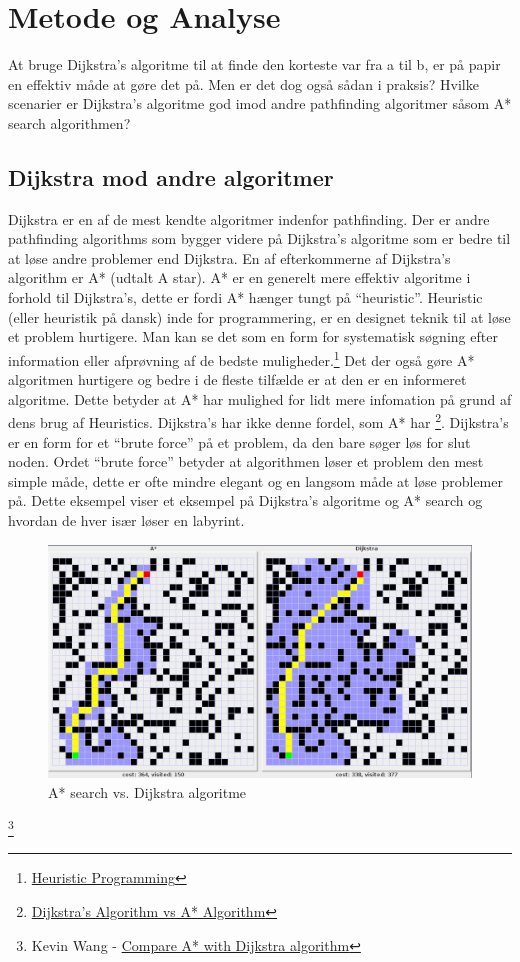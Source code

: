 \documentclass[12pt]{article}
\begin{document}
\section{Metode og Analyse}
At bruge Dijkstra's algoritme til at finde den korteste var fra a til b, er på papir en effektiv måde at gøre det på. Men er det dog også sådan i praksis? Hvilke scenarier er Dijkstra's algoritme god imod andre pathfinding algoritmer såsom A* search algorithmen? 
\subsection{Dijkstra mod andre algoritmer}
Dijkstra er en af de mest kendte algoritmer indenfor pathfinding. 
Der er andre pathfinding algorithms som bygger videre på Dijkstra’s algoritme 
som er bedre til at løse andre problemer end Dijkstra. En af efterkommerne af Dijkstra’s algorithm er A* 
(udtalt A star). A* er en generelt mere effektiv algoritme i forhold til Dijkstra’s, 
dette er fordi A* hænger tungt på “heuristic”. Heuristic (eller heuristik på dansk) inde for programmering, 
er en designet teknik til at løse et problem hurtigere. Man kan se det som en form for systematisk søgning 
efter information eller afprøvning af de bedste muligheder.\footnote{\href{https://softjourn.com/insights/heuristic-programming}{Heuristic Programming}} Det der også gøre A* algoritmen hurtigere 
og bedre i de fleste tilfælde er at den er en informeret algoritme. Dette betyder at A* har mulighed for lidt 
mere infomation på grund af dens brug af Heuristics. Dijkstra’s har ikke denne fordel, som A* har \footnote{\href{https://stackabuse.com/dijkstras-algorithm-vs-a-algorithm/}{Dijkstra's Algorithm vs A* Algorithm}}. Dijkstra’s 
er en form for et “brute force” på et problem, da den bare søger løs for slut noden. 
Ordet “brute force” betyder at algorithmen løser et problem den mest simple måde, dette er ofte mindre elegant og en langsom måde at løse problemer på. 
Dette eksempel viser et eksempel på Dijkstra’s algoritme og A* 
search og hvordan de hver især løser en labyrint.  
\begin{figure}[ht]
  \includegraphics[width=\textwidth]{AstarvsDjikstra.png}
  \caption{A* search vs. Dijkstra algoritme}\label{A*vsDjikstra}
\end{figure}\footnote{Kevin Wang - \href{http://plainaslife.blogspot.com/2015/02/compare-with-dijkstra-algorithm.html}{Compare A* with Dijkstra algorithm}}
\end{document}

